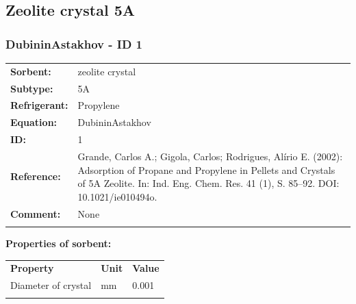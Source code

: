 \subsection{Zeolite crystal 5A}
%
\subsubsection{DubininAstakhov - ID 1}
%
\begin{tabular}[l]{|lp{11.5cm}|}
\hline
\addlinespace

\textbf{Sorbent:} & zeolite crystal \\
\textbf{Subtype:} & 5A \\
\textbf{Refrigerant:} & Propylene \\
\textbf{Equation:} & DubininAstakhov \\
\textbf{ID:} & 1 \\
\textbf{Reference:} & Grande, Carlos A.; Gigola, Carlos; Rodrigues, Alírio E. (2002): Adsorption of Propane and Propylene in Pellets and Crystals of 5A Zeolite. In: Ind. Eng. Chem. Res. 41 (1), S. 85–92. DOI: 10.1021/ie010494o. \\
\textbf{Comment:} & None \\

\addlinespace
\hline
\end{tabular}
\newline

\textbf{Properties of sorbent:}
\newline
%
\begin{longtable}[l]{lll}
\toprule
\addlinespace
\textbf{Property} & \textbf{Unit} & \textbf{Value} \\
\addlinespace
\midrule
\endhead
\bottomrule
\endfoot
\bottomrule
\endlastfoot
\addlinespace

Diameter of crystal & \si{\milli\meter} & 0.001\\

\addlinespace\end{longtable}

